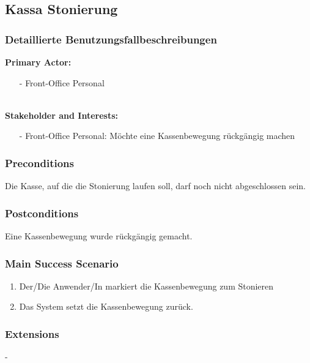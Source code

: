 \documentclass[./detailed_overview_usecases.tex]{subfiles}
\begin{document}
    \subsection{Kassa Stonierung}
    \subsubsection{Detaillierte Benutzungsfallbeschreibungen}
    \textbf{Primary Actor:}
    \begin{itemize}
        \item [-] Front-Office Personal
    \end{itemize}
    \\
    \textbf{Stakeholder and Interests:}
    \begin{itemize}
        \item[-] Front-Office Personal: Möchte eine Kassenbewegung rückgängig machen
    \end{itemize}

    \subsubsection*{Preconditions}
    Die Kasse, auf die die Stonierung laufen soll, darf noch nicht abgeschlossen sein.

    \subsubsection*{Postconditions}
    Eine Kassenbewegung wurde rückgängig gemacht.

    \subsubsection*{Main Success Scenario}
    \begin{enumerate}
        \item Der/Die Anwender/In markiert die Kassenbewegung zum Stonieren
        \item Das System setzt die Kassenbewegung zurück.
    \end{enumerate}

    \subsubsection*{Extensions}
    -
\end{document}
